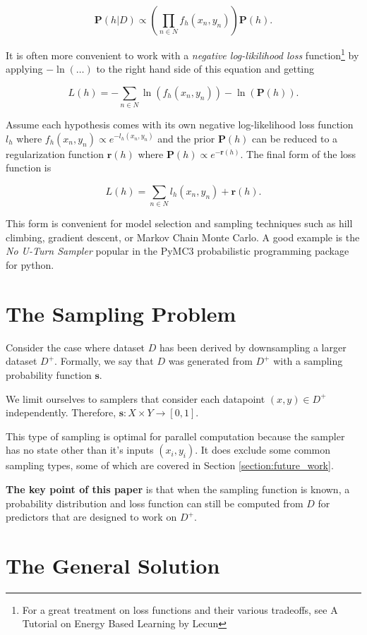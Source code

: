 \documentclass[twoside]{article}
\begin{document}
\[\mathbf{P}(h|D)\propto \left( \prod_{n \in N} f_h(x_n,y_n) \right) \mathbf{P}(h).\]

It is often more convenient to work with a \textit{negative log-likilihood loss} function\footnote{For a great treatment on loss functions and their various tradeoffs, see A Tutorial on Energy Based Learning by Lecun\cite{lecun}} by applying \(-\ln(\ldots)\) to the right hand side of this equation and getting

\[L(h)=-\sum_{n \in N} \ln(f_h(x_n,y_n))-\ln(\mathbf{P}(h)).\]

Assume each hypothesis comes with its own negative log-likelihood loss function \(l_h\) where \(f_h(x_n,y_n)\propto e^{-l_h(x_n,y_n)}\) and the prior \(\mathbf{P}(h)\) can be reduced to a regularization function \(\mathbf{r}(h)\) where \(\mathbf{P}(h)\propto e^{-\mathbf{r}(h)}\). The final form of the loss function is

\[L(h)=\sum_{n \in N} l_h(x_n,y_n)+\mathbf{r}(h).\]

This form is convenient for model selection and sampling techniques such as hill climbing, gradient descent, or Markov Chain Monte Carlo. A good example is the \textit{No U-Turn Sampler}\cite{gelman} popular in the PyMC3\cite{pymc3} probabilistic programming package for python.

\section{The Sampling Problem}
\label{section:problem}

Consider the case where dataset \(D\) has been derived by downsampling a larger dataset \(D^+\). Formally, we say that \(D\) was generated from \(D^+\) with a sampling probability function \(\mathbf{s}\).

We limit ourselves to samplers that consider each datapoint \((x, y) \in D^+\) independently. Therefore, \(\mathbf{s}: X \times Y \rightarrow \left [ 0, 1\right ]\).

This type of sampling is optimal for parallel computation because the sampler has no state other than it's inputs \((x_i, y_i)\). It does exclude some common sampling types, some of which are covered in Section \ref{section:future_work}.

\textbf{The key point of this paper} is that when the sampling function is known, a probability distribution and loss function can still be computed from \(D\) for predictors that are designed to work on \(D^+\).

\section{The General Solution}
\label{section:solution}
\end{document}
